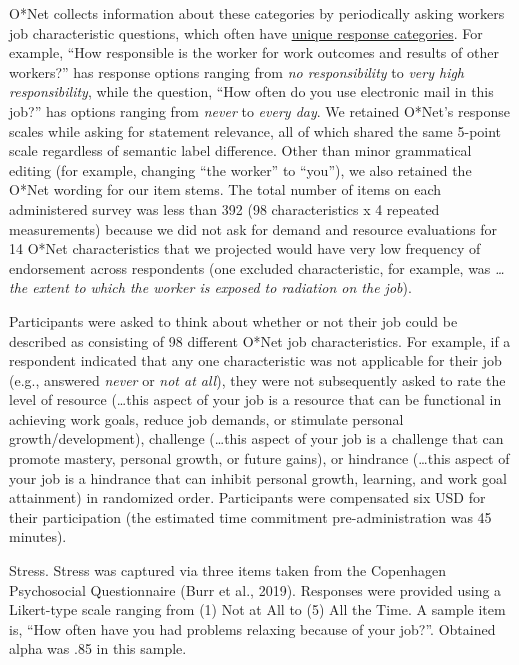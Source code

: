 \documentclass[
  man]{apa7}
\begin{document}
O*Net collects information about these categories by periodically asking workers job characteristic questions, which often have \href{https://www.ONETonline.org/find/descriptor/result/4.C.1.c.2}{unique response categories}. For example, ``How responsible is the worker for work outcomes and results of other workers?'' has response options ranging from \emph{no responsibility} to \emph{very high responsibility}, while the question, ``How often do you use electronic mail in this job?'' has options ranging from \emph{never} to \emph{every day}. We retained O*Net's response scales while asking for statement relevance, all of which shared the same 5-point scale regardless of semantic label difference. Other than minor grammatical editing (for example, changing ``the worker'' to ``you''), we also retained the O*Net wording for our item stems. The total number of items on each administered survey was less than 392 (98 characteristics x 4 repeated measurements) because we did not ask for demand and resource evaluations for 14 O*Net characteristics that we projected would have very low frequency of endorsement across respondents (one excluded characteristic, for example, was \emph{\ldots the extent to which the worker is exposed to radiation on the job}).

Participants were asked to think about whether or not their job could be described as consisting of 98 different O*Net job characteristics. For example, if a respondent indicated that any one characteristic was not applicable for their job (e.g., answered \emph{never} or \emph{not at all}), they were not subsequently asked to rate the level of resource (\ldots this aspect of your job is a resource that can be functional in achieving work goals, reduce job demands, or stimulate personal growth/development), challenge (\ldots this aspect of your job is a challenge that can promote mastery, personal growth, or future gains), or hindrance (\ldots this aspect of your job is a hindrance that can inhibit personal growth, learning, and work goal attainment) in randomized order. Participants were compensated six USD for their participation (the estimated time commitment pre-administration was 45 minutes).

Stress. Stress was captured via three items taken from the Copenhagen Psychosocial Questionnaire (Burr et al., 2019). Responses were provided using a Likert-type scale ranging from (1) Not at All to (5) All the Time. A sample item is, ``How often have you had problems relaxing because of your job?''. Obtained alpha was .85 in this sample.
\end{document}
